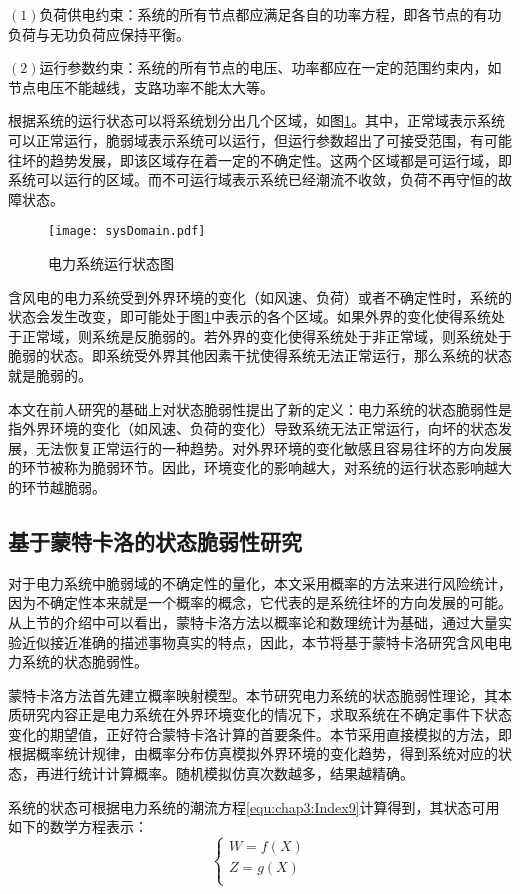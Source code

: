 $(1)$负荷供电约束：系统的所有节点都应满足各自的功率方程，即各节点的有功负荷与无功负荷应保持平衡。

$(2)$运行参数约束：系统的所有节点的电压、功率都应在一定的范围约束内，如节点电压不能越线，支路功率不能太大等。

根据系统的运行状态可以将系统划分出几个区域，如图\ref{fig:sysDomain}。其中，正常域表示系统可以正常运行，脆弱域表示系统可以运行，但运行参数超出了可接受范围，有可能往坏的趋势发展，即该区域存在着一定的不确定性。这两个区域都是可运行域，即系统可以运行的区域。而不可运行域表示系统已经潮流不收敛，负荷不再守恒的故障状态。
\begin{figure}[H] %
  \centering
  \texttt{[image: sysDomain.pdf]}
  \caption{电力系统运行状态图}
  \label{fig:sysDomain}
\end{figure}

含风电的电力系统受到外界环境的变化（如风速、负荷）或者不确定性时，系统的状态会发生改变，即可能处于图\ref{fig:sysDomain}中表示的各个区域。如果外界的变化使得系统处于正常域，则系统是反脆弱的。若外界的变化使得系统处于非正常域，则系统处于脆弱的状态。即系统受外界其他因素干扰使得系统无法正常运行，那么系统的状态就是脆弱的。

本文在前人研究的基础上对状态脆弱性提出了新的定义：电力系统的状态脆弱性是指外界环境的变化（如风速、负荷的变化）导致系统无法正常运行，向坏的状态发展，无法恢复正常运行的一种趋势。对外界环境的变化敏感且容易往坏的方向发展的环节被称为脆弱环节。因此，环境变化的影响越大，对系统的运行状态影响越大的环节越脆弱。

\subsection{基于蒙特卡洛的状态脆弱性研究}
\label{sec:dynamic}
对于电力系统中脆弱域的不确定性的量化，本文采用概率的方法来进行风险统计，因为不确定性本来就是一个概率的概念，它代表的是系统往坏的方向发展的可能。从上节的介绍中可以看出，蒙特卡洛方法以概率论和数理统计为基础，通过大量实验近似接近准确的描述事物真实的特点，因此，本节将基于蒙特卡洛研究含风电电力系统的状态脆弱性。

蒙特卡洛方法首先建立概率映射模型。本节研究电力系统的状态脆弱性理论，其本质研究内容正是电力系统在外界环境变化的情况下，求取系统在不确定事件下状态变化的期望值，正好符合蒙特卡洛计算的首要条件。本节采用直接模拟的方法，即根据概率统计规律，由概率分布仿真模拟外界环境的变化趋势，得到系统对应的状态，再进行统计计算概率。随机模拟仿真次数越多，结果越精确。

系统的状态可根据电力系统的潮流方程\ref{equ:chap3:Index9}计算得到，其状态可用如下的数学方程表示：
\begin{equation}\label{equ:chap3:Index10}
\left\{\begin{array}{l}
        W=f(X)\\
        Z=g(X)\\
\end{array}\right.
\end{equation}

